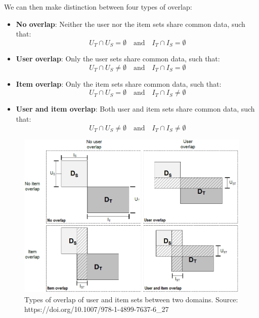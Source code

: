 We can then make distinction between four types of overlap:
\begin{itemize}
\item \textbf{No overlap}: Neither the user nor the item sets share common data, such that:
\begin{equation*}
U_T \cap U_S = \emptyset \quad \text{and} \quad I_T \cap I_S = \emptyset
\end{equation*}
\item \textbf{User overlap}: Only the user sets share common data, such that:
\begin{equation*}
U_T \cap U_S \neq \emptyset \quad \text{and} \quad I_T \cap I_S = \emptyset
\end{equation*}
\item \textbf{Item overlap}: Only the item sets share common data, such that:
\begin{equation*}
U_T \cap U_S = \emptyset \quad \text{and} \quad I_T \cap I_S \neq \emptyset
\end{equation*}
\item \textbf{User and item overlap}: Both user and item sets share common data, such that:
\begin{equation*}
U_T \cap U_S \neq \emptyset \quad \text{and} \quad I_T \cap I_S \neq \emptyset
\end{equation*}
\end{itemize}
\begin{figure}[hbt!]
  \centering
  \includegraphics[width=\textwidth]{pictures/domains-overlap}
  \caption{Types of overlap of user and item sets between two domains. Source: https://doi.org/10.1007/978-1-4899-7637-6\_27}
\end{figure}


